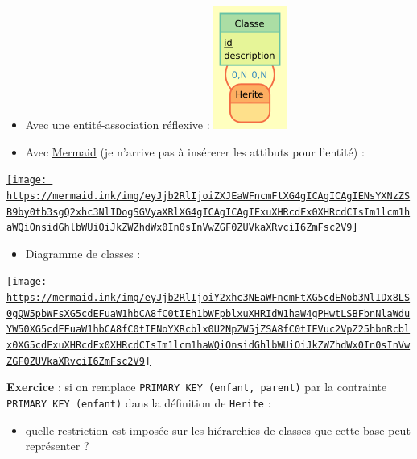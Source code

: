 \documentclass[11pt]{article}
\makeatletter
\def\maxwidth{\ifdim\Gin@nat@width>\linewidth\linewidth
    \else\Gin@nat@width\fi}
\let\Oldincludegraphics\includegraphics
\renewcommand{\includegraphics}[1]{\Oldincludegraphics[width=.8\maxwidth]{#1}}
\providecommand{\tightlist}{%
      \setlength{\itemsep}{0pt}\setlength{\parskip}{0pt}}
\makeatother
\begin{document}
\begin{itemize}
\item
  Avec une entité-association réflexive :
  \includegraphics{mocodo/Classes/Classes.png}
\item
  Avec \href{https://mermaid-js.github.io/mermaid-live-editor/}{Mermaid}
  (je n'arrive pas à insérerer les attibuts pour l'entité) :
\end{itemize}

\href{https://mermaid-js.github.io/mermaid-live-editor/\#/edit/eyJjb2RlIjoiZXJEaWFncmFtXG4gICAgICAgIENsYXNzZSB9by0tb3sgQ2xhc3NlIDogSGVyaXRlXG4gICAgICAgIFxuXHRcdFx0XHRcdCIsIm1lcm1haWQiOnsidGhlbWUiOiJkZWZhdWx0In0sInVwZGF0ZUVkaXRvciI6ZmFsc2V9}{\texttt{[image: https://mermaid.ink/img/eyJjb2RlIjoiZXJEaWFncmFtXG4gICAgICAgIENsYXNzZSB9by0tb3sgQ2xhc3NlIDogSGVyaXRlXG4gICAgICAgIFxuXHRcdFx0XHRcdCIsIm1lcm1haWQiOnsidGhlbWUiOiJkZWZhdWx0In0sInVwZGF0ZUVkaXRvciI6ZmFsc2V9]}}

    \begin{itemize}
\tightlist
\item
  Diagramme de classes :
\end{itemize}

\href{https://mermaid-js.github.io/mermaid-live-editor/\#/edit/eyJjb2RlIjoiY2xhc3NEaWFncmFtXG5cdENob3NlIDx8LS0gQW5pbWFsXG5cdEFuaW1hbCA8fC0tIEh1bWFpblxuXHRIdW1haW4gPHwtLSBFbnNlaWduYW50XG5cdEFuaW1hbCA8fC0tIENoYXRcblx0U2NpZW5jZSA8fC0tIEVuc2VpZ25hbnRcblx0XG5cdFxuXHRcdFx0XHRcdCIsIm1lcm1haWQiOnsidGhlbWUiOiJkZWZhdWx0In0sInVwZGF0ZUVkaXRvciI6ZmFsc2V9}{\texttt{[image: https://mermaid.ink/img/eyJjb2RlIjoiY2xhc3NEaWFncmFtXG5cdENob3NlIDx8LS0gQW5pbWFsXG5cdEFuaW1hbCA8fC0tIEh1bWFpblxuXHRIdW1haW4gPHwtLSBFbnNlaWduYW50XG5cdEFuaW1hbCA8fC0tIENoYXRcblx0U2NpZW5jZSA8fC0tIEVuc2VpZ25hbnRcblx0XG5cdFxuXHRcdFx0XHRcdCIsIm1lcm1haWQiOnsidGhlbWUiOiJkZWZhdWx0In0sInVwZGF0ZUVkaXRvciI6ZmFsc2V9]}}

    \textbf{Exercice} : si on remplace
\texttt{PRIMARY\ KEY\ (enfant,\ parent)} par la contrainte
\texttt{PRIMARY\ KEY\ (enfant)} dans la définition de \texttt{Herite} :

\begin{itemize}
\tightlist
\item
  quelle restriction est imposée sur les hiérarchies de classes que
  cette base peut représenter ?
\end{itemize}
\end{document}
